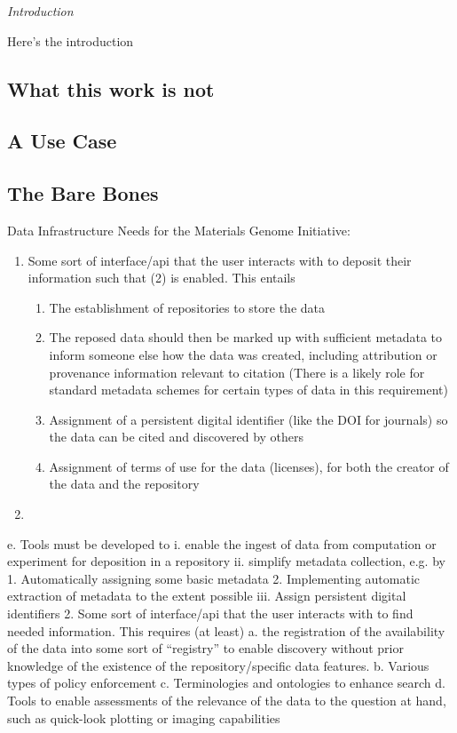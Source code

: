 \textit{Introduction}

Here's the introduction

\subsection{What this work is not}

\subsection{A Use Case}

\subsection{The Bare Bones}
Data Infrastructure Needs for the Materials Genome Initiative:
\begin{enumerate}
\item Some sort of interface/api that the user interacts with to deposit their information such that (2) is enabled.  This entails
\begin{enumerate}
\item The establishment of repositories to store the data
\item The reposed data should then be marked up with sufficient metadata to inform someone else how the data was created, including attribution or provenance information relevant to citation 
(There is a likely role for standard metadata schemes for certain types of data in this requirement)
\item	Assignment of a persistent digital identifier (like the DOI for journals) so the data can be cited and discovered by others
\item Assignment of terms of use for the data (licenses), for both the creator of the data and the repository
\end{enumerate}
\item 
\end{enumerate}

e.	Tools must be developed to
i.	enable the ingest of data from computation or experiment for deposition in a repository
ii.	simplify metadata collection, e.g. by
1.	Automatically assigning some basic metadata
2.	Implementing automatic extraction of metadata to the extent possible 
iii.	Assign persistent digital identifiers
2.	Some sort of interface/api that the user interacts with to find needed information.  This requires (at least)
a.	the registration of the availability of the data into some sort of “registry” to enable discovery without prior knowledge of the existence of the repository/specific data features.
b.	Various types of policy enforcement  
c.	Terminologies and ontologies to enhance search 
d.	Tools to enable assessments of the relevance of the data to the question at hand, such as quick-look plotting or imaging capabilities



